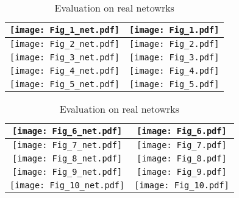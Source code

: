 \documentclass[twocolumn]{autart}
\begin{document}
\centering
\begin{table*}[ht]
\caption{Evaluation on real netowrks}
\centering
\begin{tabular}{|c|c|}
\hline
\texttt{[image: Fig\_1\_net.pdf]}&\texttt{[image: Fig\_1.pdf]}\\
 \hline
\texttt{[image: Fig\_2\_net.pdf]}&\texttt{[image: Fig\_2.pdf]}\\
\hline
\texttt{[image: Fig\_3\_net.pdf]}&\texttt{[image: Fig\_3.pdf]}\\
 \hline
\texttt{[image: Fig\_4\_net.pdf]}&\texttt{[image: Fig\_4.pdf]}\\
\hline
\texttt{[image: Fig\_5\_net.pdf]}&\texttt{[image: Fig\_5.pdf]}\\
\hline

\end{tabular}
\label{tab:10}
\end{table*}

\begin{table*}[ht]
\caption*{Evaluation on real netowrks}
\centering
\begin{tabular}{|c|c|}
\hline
\texttt{[image: Fig\_6\_net.pdf]}&\texttt{[image: Fig\_6.pdf]}\\
\hline
\texttt{[image: Fig\_7\_net.pdf]}&\texttt{[image: Fig\_7.pdf]}\\
 \hline
\texttt{[image: Fig\_8\_net.pdf]}&\texttt{[image: Fig\_8.pdf]}\\
\hline
\texttt{[image: Fig\_9\_net.pdf]}&\texttt{[image: Fig\_9.pdf]}\\
 \hline
\texttt{[image: Fig\_10\_net.pdf]}&\texttt{[image: Fig\_10.pdf]}\\
\hline
\end{tabular}
\label{tab:gt}
\end{table*}
\end{document}
